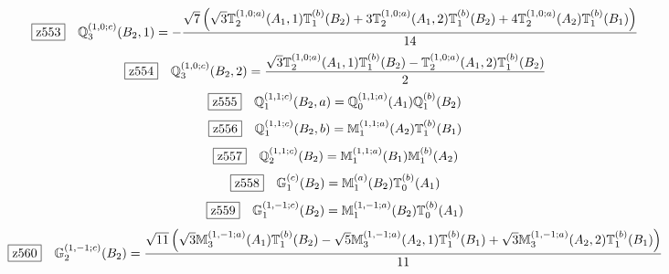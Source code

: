 \documentclass[fleqn,10pt,landscape]{jsarticle}
\begin{document}
\begin{dmath*}
\hspace*{3mm}\fbox{z553}\quad \mathbb{Q}_{3}^{(1,0;c)}(B_{2},1)=- \frac{\sqrt{7} \left(\sqrt{3} \mathbb{T}_{2}^{(1,0;a)}(A_{1},1) \mathbb{T}_{1}^{(b)}(B_{2}) + 3 \mathbb{T}_{2}^{(1,0;a)}(A_{1},2) \mathbb{T}_{1}^{(b)}(B_{2}) + 4 \mathbb{T}_{2}^{(1,0;a)}(A_{2}) \mathbb{T}_{1}^{(b)}(B_{1})\right)}{14}
\end{dmath*}
\begin{dmath*}
\hspace*{3mm}\fbox{z554}\quad \mathbb{Q}_{3}^{(1,0;c)}(B_{2},2)=\frac{\sqrt{3} \mathbb{T}_{2}^{(1,0;a)}(A_{1},1) \mathbb{T}_{1}^{(b)}(B_{2}) - \mathbb{T}_{2}^{(1,0;a)}(A_{1},2) \mathbb{T}_{1}^{(b)}(B_{2})}{2}
\end{dmath*}
\begin{dmath*}
\hspace*{3mm}\fbox{z555}\quad \mathbb{Q}_{1}^{(1,1;c)}(B_{2},a)=\mathbb{Q}_{0}^{(1,1;a)}(A_{1}) \mathbb{Q}_{1}^{(b)}(B_{2})
\end{dmath*}
\begin{dmath*}
\hspace*{3mm}\fbox{z556}\quad \mathbb{Q}_{1}^{(1,1;c)}(B_{2},b)=\mathbb{M}_{1}^{(1,1;a)}(A_{2}) \mathbb{T}_{1}^{(b)}(B_{1})
\end{dmath*}
\begin{dmath*}
\hspace*{3mm}\fbox{z557}\quad \mathbb{Q}_{2}^{(1,1;c)}(B_{2})=\mathbb{M}_{1}^{(1,1;a)}(B_{1}) \mathbb{M}_{1}^{(b)}(A_{2})
\end{dmath*}
\begin{dmath*}
\hspace*{3mm}\fbox{z558}\quad \mathbb{G}_{1}^{(c)}(B_{2})=\mathbb{M}_{1}^{(a)}(B_{2}) \mathbb{T}_{0}^{(b)}(A_{1})
\end{dmath*}
\begin{dmath*}
\hspace*{3mm}\fbox{z559}\quad \mathbb{G}_{1}^{(1,-1;c)}(B_{2})=\mathbb{M}_{1}^{(1,-1;a)}(B_{2}) \mathbb{T}_{0}^{(b)}(A_{1})
\end{dmath*}
\begin{dmath*}
\hspace*{3mm}\fbox{z560}\quad \mathbb{G}_{2}^{(1,-1;c)}(B_{2})=\frac{\sqrt{11} \left(\sqrt{3} \mathbb{M}_{3}^{(1,-1;a)}(A_{1}) \mathbb{T}_{1}^{(b)}(B_{2}) - \sqrt{5} \mathbb{M}_{3}^{(1,-1;a)}(A_{2},1) \mathbb{T}_{1}^{(b)}(B_{1}) + \sqrt{3} \mathbb{M}_{3}^{(1,-1;a)}(A_{2},2) \mathbb{T}_{1}^{(b)}(B_{1})\right)}{11}
\end{dmath*}
\end{document}
